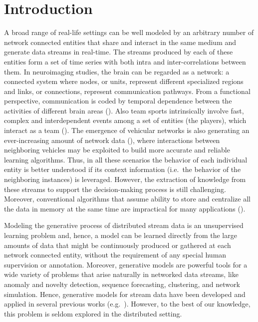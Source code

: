 \section{Introduction}
\label{sec:chp2_intro}
A broad range of real-life settings can be well modeled by an arbitrary number of network connected entities that share and interact in the same medium and generate data streams in real-time. The streams produced by each of these entities form a set of time series with both intra and inter-correlations between them. In neuroimaging studies, the brain can be regarded as a network: a connected system where nodes, or units, represent different specialized regions and links, or connections, represent communication pathways. From a functional perspective, communication is coded by temporal dependence between the activities of different brain areas (\citet{DeVicoFallani20130521}). Also team sports intrinsically involve fast, complex and interdependent events among a set of entities (the players), which interact as a team (\citet{Tora2017, Theagarajan2018}). The emergence of vehicular networks is also generating an ever-increasing amount of network data (\citet{Cheng2018}), where interactions between neighboring vehicles may be exploited to build more accurate and reliable learning algorithms. Thus, in all these scenarios the behavior of each individual entity is better understood if its context information (i.e.\ the behavior of the neighboring instances) is leveraged. However, the extraction of knowledge from these streams to support the decision-making process is still challenging. Moreover, conventional algorithms that assume ability to store and centralize all the data in memory at the same time are impractical for many applications (\citet{Gama2007}).

Modeling the generative process of distributed stream data is an unsupervised learning problem and, hence, a model can be learned directly from the large amounts of data that might be continuously produced or gathered at each network connected entity, without the requirement of any special human supervision or annotation. Moreover, generative models are powerful tools for a wide variety of problems that arise naturally in networked data streams, like anomaly and novelty detection, sequence forecasting, clustering, and network simulation. Hence, generative models for stream data have been developed and applied in several previous works (e.g.\ \citet{Laxman2008, Hayat2010, Hofmann2011}). However, to the best of our knowledge, this problem is seldom explored in the  distributed setting.

